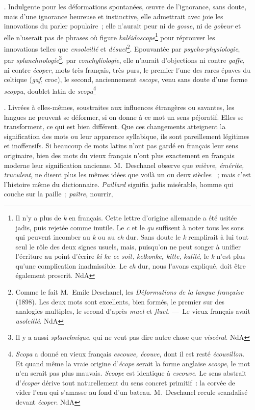 \documentclass[french,twoside]{book} %
\begin{document}
. Indulgente pour les déformations spontanées, œuvre de l’ignorance, sans doute, mais d’une ignorance heureuse et instinctive, elle admettrait avec joie les innovations du parler populaire ; elle n’aurait peur ni de {\itshape gosse}, ni de {\itshape gobeur} et elle n’userait pas de phrases où figure {\itshape kaléidoscope}\footnote{Il n’y a plus de {\itshape k} en français. Cette lettre d’origine allemande a été usitée jadis, puis rejetée comme inutile. Le {\itshape c} et le {\itshape qu} suffisent à noter tous les sons qui peuvent incomber au {\itshape k} ou au {\itshape ch} dur. Sans doute le {\itshape k} remplirait à lui tout seul le rôle des deux signes usuels, mais, puisqu’on ne peut songer à unifier l’écriture au point d’écrire {\itshape ki ke ce soit, kelkonke, kitte, kalité}, le {\itshape k} n’est plus qu’une complication inadmissible. Le {\itshape ch} dur, nous l’avons expliqué, doit être également proscrit. NdA} pour réprouver les innovations telles que {\itshape ensoleillé} et {\itshape désuet}\footnote{Comme le fait M. Emile Deschanel, les {\itshape Déformations de la langue française} (1898). Les deux mots sont excellents, bien formés, le premier sur des analogies multiples, le second d’après {\itshape muet} et {\itshape fluet}. — Le vieux français avait {\itshape asoleillé}. NdA}. Epouvantée par {\itshape psycho-physiologie}, par {\itshape splanchnologie}\footnote{Il y a aussi {\itshape splanchnique}, qui ne veut pas dire autre chose que {\itshape viscéral}. NdA}, par {\itshape conchyliologie}, elle n’aurait d’objections ni contre {\itshape gaffe}, ni contre {\itshape écoper}, mots très français, très purs, le premier l’une des rares épaves du celtique ({\itshape gaf}, croc), le second, anciennement {\itshape escope}, venu sans doute d’une forme {\itshape scoppa}, doublet latin de {\itshape scopa}\footnote{{\itshape Scopa} a donné en vieux français {\itshape escouve, écouve}, dont il est resté {\itshape écouvillon}. Et quand même la vraie origine d’{\itshape écope} serait la forme anglaise {\itshape scoope}, le mot n’en serait pas plus mauvais. {\itshape Scoope} est identique à {\itshape escouve}. Le sens abstrait d’{\itshape écoper} dérive tout naturellement du sens concret primitif : la corvée de vider l’eau qui s’amasse au fond d’un bateau. M. Deschanel recule scandalisé devant {\itshape écoper}. NdA}\par
. Livrées à elles-mêmes, soustraites aux influences étrangères ou savantes, les langues ne peuvent se déformer, si on donne à ce mot un sens péjoratif. Elles se transforment, ce qui est bien différent. Que ces changements atteignent la signification des mots ou leur apparence syllabique, ils sont pareillement légitimes et inoffensifs. Si beaucoup de mots latins n’ont pas gardé en français leur sens originaire, bien des mots du vieux français n’ont plus exactement en français moderne leur signification ancienne. M. Deschanel observe que {\itshape mièvre, émérite, truculent}, ne disent plus les mêmes idées que voilà un ou deux siècles  ; mais c’est l’histoire même du dictionnaire. {\itshape Paillard} signifia jadis misérable, homme qui couche sur la paille ; {\itshape paître}, nourrir,\par
\end{document}

